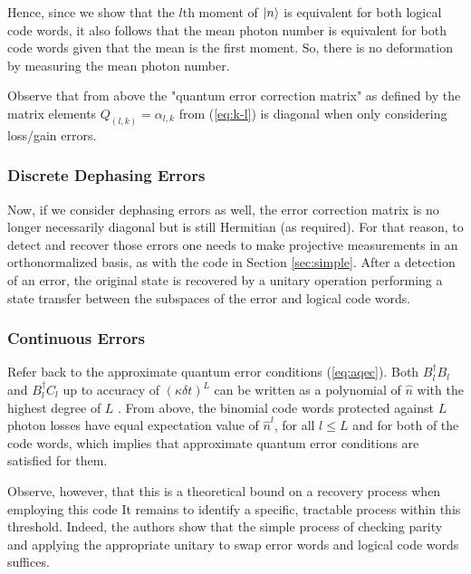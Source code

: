 \documentclass[12]{amsart}
\newcommand\0{\mathbf{0}}
\newcommand\<{\langle}
\renewcommand\>{\rangle}
\begin{document}
Hence, since we show that the $l$th moment of $\ket{n}$ is equivalent for both logical code words, it also follows that the mean photon number is equivalent for both code words given that the mean is the first moment. So, there is no deformation by measuring the mean photon number.

Observe that from above the "quantum error correction matrix" as defined by the matrix elements $Q_{(l, k)} = \alpha_{l, k}$ from (\ref{eq:k-l}) is diagonal when only considering loss/gain errors.

\subsubsection{Discrete Dephasing Errors}

Now, if we consider dephasing errors as well, the error correction matrix is no longer necessarily diagonal but is still Hermitian (as required). For that reason, to detect and recover those errors one needs to make projective measurements in an orthonormalized basis, as with the code in Section \ref{sec:simple}. After a detection of an error, the original state is recovered by a unitary operation performing a state transfer between the subspaces of the error and logical code words.

\subsubsection{Continuous Errors}
\label{sec:cat-cont}

Refer back to the approximate quantum error conditions (\ref{eq:aqec}). Both $B_l^\dag B_l$ and $B_l^\dag C_l$ up to accuracy of $(\kappa \delta t)^L$ can be written as a polynomial of $\hat{n}$ with the highest degree of $L$ \cite{michael2016new}. From above, the binomial code words protected against $L$ photon losses have equal expectation value of $\hat{n}^l$, for all $l \leq L$ and for both of the code words, which implies that approximate quantum error conditions are satisfied for them.

Observe, however, that this is a theoretical bound on a recovery process when employing this code It remains to identify a specific, tractable process within this threshold. Indeed, the authors show that the simple process of checking parity and applying the appropriate unitary to swap error words and logical code words suffices.
\end{document}
